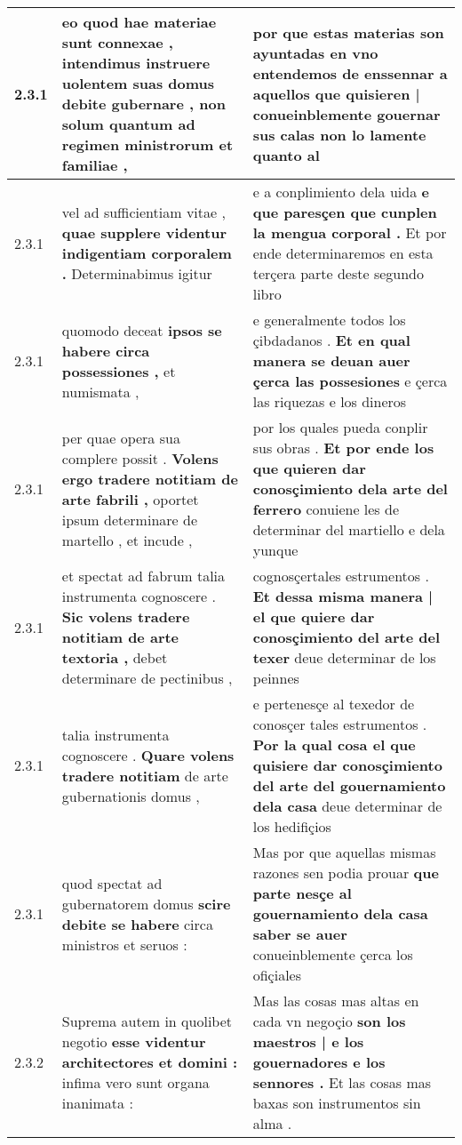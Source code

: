 \begin{tabular}{|p{1cm}|p{6.5cm}|p{6.5cm}|}
2.3.1 & eo quod hae materiae sunt connexae , \textbf{ intendimus instruere uolentem suas domus debite gubernare , } non solum quantum ad regimen ministrorum et familiae , & por que estas materias son ayuntadas en vno entendemos de enssennar \textbf{ a aquellos que quisieren | conueinblemente gouernar sus calas } non lo lamente quanto al \\\hline
2.3.1 & vel ad sufficientiam vitae , \textbf{ quae supplere videntur indigentiam corporalem . } Determinabimus igitur & e a conplimiento dela uida \textbf{ e que paresçen que cunplen la mengua corporal . } Et por ende determinaremos en esta terçera parte deste segundo libro \\\hline
2.3.1 & quomodo deceat \textbf{ ipsos se habere circa possessiones , } et numismata , & e generalmente todos los çibdadanos . \textbf{ Et en qual manera se deuan auer çerca las possesiones } e çerca las riquezas e los dineros \\\hline
2.3.1 & per quae opera sua complere possit . \textbf{ Volens ergo tradere notitiam de arte fabrili , } oportet ipsum determinare de martello , et incude , & por los quales pueda conplir sus obras . \textbf{ Et por ende los que quieren dar conosçimiento dela arte del ferrero } conuiene les de determinar del martiello e dela yunque \\\hline
2.3.1 & et spectat ad fabrum talia instrumenta cognoscere . \textbf{ Sic volens tradere notitiam de arte textoria , } debet determinare de pectinibus , & cognosçertales estrumentos . \textbf{ Et dessa misma manera | el que quiere dar conosçimiento del arte del texer } deue determinar de los peinnes \\\hline
2.3.1 & talia instrumenta cognoscere . \textbf{ Quare volens tradere notitiam } de arte gubernationis domus , & e pertenesçe al texedor de conosçer tales estrumentos . \textbf{ Por la qual cosa el que quisiere dar conosçimiento del arte del gouernamiento dela casa } deue determinar de los hedifiçios \\\hline
2.3.1 & quod spectat ad gubernatorem domus \textbf{ scire debite se habere } circa ministros et seruos : & Mas por que aquellas mismas razones sen podia prouar \textbf{ que parte nesçe al gouernamiento dela casa saber se auer } conueinblemente çerca los ofiçiales \\\hline
2.3.2 & Suprema autem in quolibet negotio \textbf{ esse videntur architectores et domini : } infima vero sunt organa inanimata : & Mas las cosas mas altas en cada vn negoçio \textbf{ son los maestros | e los gouernadores e los sennores . } Et las cosas mas baxas son instrumentos sin alma . \\\hline

\end{tabular}
